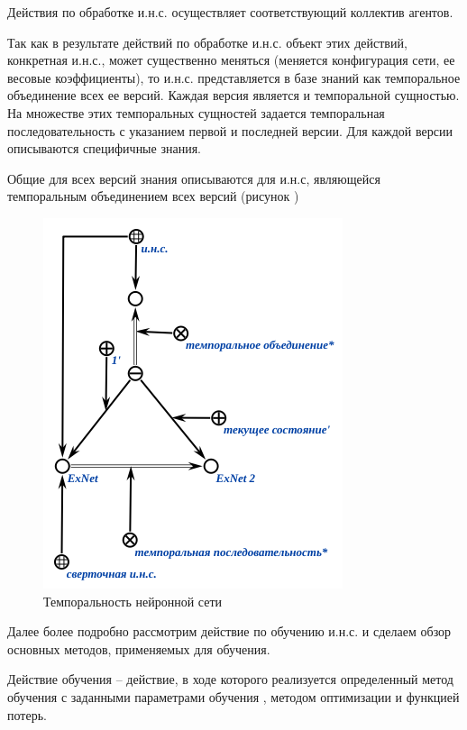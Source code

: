 Действия по обработке и.н.с. осуществляет соответствующий коллектив агентов. 

Так как в результате действий по обработке и.н.с. объект этих действий, конкретная и.н.с., может существенно меняться (меняется конфигурация сети, ее весовые коэффициенты), то и.н.с. представляется в базе знаний как темпоральное объединение всех ее версий. Каждая версия является   и темпоральной сущностью. На множестве этих темпоральных сущностей задается темпоральная последовательность с указанием первой и последней версии. Для каждой версии описываются специфичные знания.

Общие для всех версий знания описываются для и.н.с, являющейся темпоральным объединением всех версий (рисунок \textit{})

\begin{figure}[H]
	\includegraphics[scale=0.8]{author/part3/figures/temporal_neural_network_scg.png}
	\caption{Темпоральность нейронной сети}
	\label{fig:temporal_neural_network_scg}
\end{figure}

Далее более подробно рассмотрим действие по обучению и.н.с. и сделаем обзор основных методов, применяемых для обучения.

Действие обучения   -- действие, в ходе которого реализуется определенный метод обучения   с заданными параметрами обучения  , методом оптимизации и функцией потерь.


